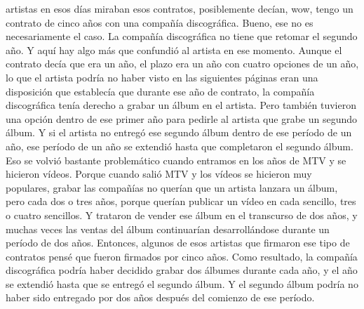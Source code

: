 \documentclass[10pt]{book}
\begin{document}
artistas en esos días miraban esos contratos, posiblemente decían, wow, tengo un contrato de cinco años con una compañía discográfica. Bueno, ese no es necesariamente el caso. La compañía discográfica no tiene que retomar el segundo año. Y aquí hay algo más que confundió al artista en ese momento. Aunque el contrato decía que era un año, el plazo era un año con cuatro opciones de un año, lo que el artista podría no haber visto en las siguientes páginas eran una disposición que establecía que durante ese año de contrato, la compañía discográfica tenía derecho a grabar un álbum en el artista. Pero también tuvieron una opción dentro de ese primer año para pedirle al artista que grabe un segundo álbum. Y si el artista no entregó ese segundo álbum dentro de ese período de un año, ese período de un año se extendió hasta que completaron el segundo álbum. Eso se volvió bastante problemático cuando entramos en los años de MTV y se hicieron vídeos. Porque cuando salió MTV y los vídeos se hicieron muy populares, grabar las compañías no querían que un artista lanzara un álbum, pero cada dos o tres años, porque querían publicar un vídeo en cada sencillo, tres o cuatro sencillos. Y trataron de vender ese álbum en el transcurso de dos años, y muchas veces las ventas del álbum continuarían desarrollándose durante un período de dos años. Entonces, algunos de esos artistas que firmaron ese tipo de contratos pensé que fueron firmados por cinco años. Como resultado, la compañía discográfica podría haber decidido grabar dos álbumes durante cada año, y el año se extendió hasta que se entregó el segundo álbum. Y el segundo álbum podría no haber sido entregado por dos años después del comienzo de ese período.\\
\end{document}
